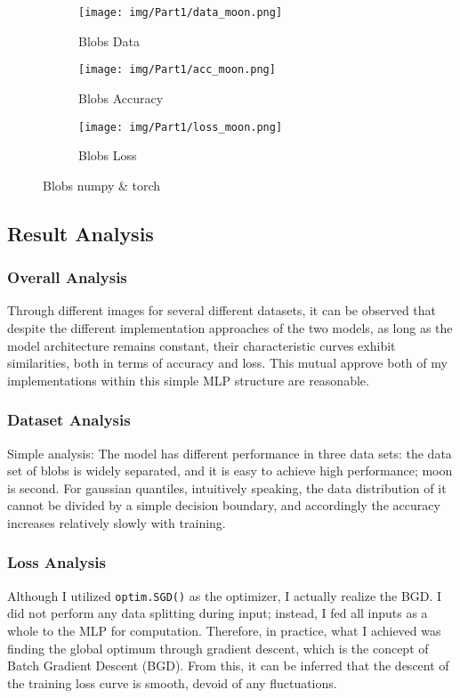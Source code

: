 \begin{figure}[!htp]
  \centering
  \begin{subfigure}[b]{0.85\textwidth}
    \texttt{[image: img/Part1/data\_moon.png]}
    \caption{Blobs Data}
  \end{subfigure}
  \begin{subfigure}[b]{0.9\textwidth}
    \texttt{[image: img/Part1/acc\_moon.png]}
    \caption{Blobs Accuracy}
  \end{subfigure}
  \begin{subfigure}[b]{0.9\textwidth}
    \texttt{[image: img/Part1/loss\_moon.png]}
    \caption{Blobs Loss}
  \end{subfigure}
  \caption{Blobs numpy \& torch}
  \label{fig:p1t1_moon}
\end{figure}

\subsection{Result Analysis}

\subsubsection{Overall Analysis}

Through different images for several different datasets, it can be observed that despite the different implementation approaches of the two models,
as long as the model architecture remains constant, their characteristic curves exhibit similarities, both in terms of accuracy and loss.
This mutual approve both of my implementations within this simple MLP structure are reasonable.

\subsubsection{Dataset Analysis}

Simple analysis:
The model has different performance in three data sets: the data set of blobs is widely separated, and it is easy to achieve high performance; moon is second.
For gaussian quantiles, intuitively speaking, the data distribution of it cannot be divided by a simple decision boundary, and accordingly the accuracy increases relatively slowly with training.

\subsubsection{Loss Analysis}\label{sec:p1t1_ana_loss}

Although I utilized \texttt{optim.SGD()} as the optimizer, I actually realize the BGD.
I did not perform any data splitting during input; instead, I fed all inputs as a whole to the MLP for computation.
Therefore, in practice, what I achieved was finding the global optimum through gradient descent, which is the concept of Batch Gradient Descent (BGD).
From this, it can be inferred that the descent of the training loss curve is smooth, devoid of any fluctuations.
